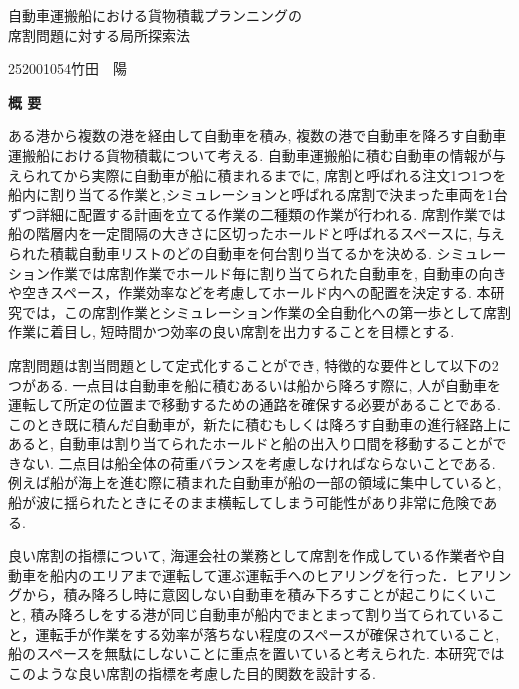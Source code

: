 \begin{center}
{\LARGE 自動車運搬船における貨物積載プランニングの\\席割問題に対する局所探索法}\\[0.5cm]
\end{center}
\hfill
{\large 252001054\qquad 竹田　陽}\\[0.5cm]
\begin{center}
{\Large \bf 概 要}\\
\end{center}

ある港から複数の港を経由して自動車を積み, 複数の港で自動車を降ろす自動車運搬船における貨物積載について考える. 自動車運搬船に積む自動車の情報が与えられてから実際に自動車が船に積まれるまでに, 席割と呼ばれる注文1つ1つを船内に割り当てる作業と,シミュレーションと呼ばれる席割で決まった車両を1台ずつ詳細に配置する計画を立てる作業の二種類の作業が行われる. 席割作業では船の階層内を一定間隔の大きさに区切ったホールドと呼ばれるスペースに, 与えられた積載自動車リストのどの自動車を何台割り当てるかを決める. シミュレーション作業では席割作業でホールド毎に割り当てられた自動車を, 自動車の向きや空きスペース，作業効率などを考慮してホールド内への配置を決定する. 本研究では，この席割作業とシミュレーション作業の全自動化への第一歩として席割作業に着目し, 短時間かつ効率の良い席割を出力することを目標とする.

席割問題は割当問題として定式化することができ, 特徴的な要件として以下の2つがある. 一点目は自動車を船に積むあるいは船から降ろす際に, 人が自動車を運転して所定の位置まで移動するための通路を確保する必要があることである. このとき既に積んだ自動車が，新たに積むもしくは降ろす自動車の進行経路上にあると, 自動車は割り当てられたホールドと船の出入り口間を移動することができない. 二点目は船全体の荷重バランスを考慮しなければならないことである. 例えば船が海上を進む際に積まれた自動車が船の一部の領域に集中していると, 船が波に揺られたときにそのまま横転してしまう可能性があり非常に危険である.

良い席割の指標について, 海運会社の業務として席割を作成している作業者や自動車を船内のエリアまで運転して運ぶ運転手へのヒアリングを行った．ヒアリングから，積み降ろし時に意図しない自動車を積み下ろすことが起こりにくいこと, 積み降ろしをする港が同じ自動車が船内でまとまって割り当てられていること，運転手が作業をする効率が落ちない程度のスペースが確保されていること, 船のスペースを無駄にしないことに重点を置いていると考えられた. 本研究ではこのような良い席割の指標を考慮した目的関数を設計する.


